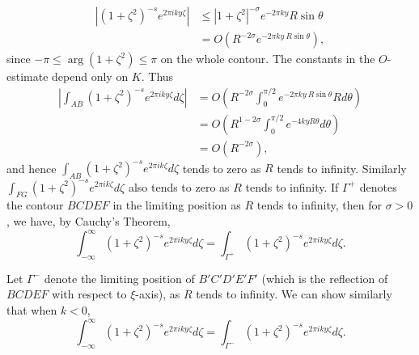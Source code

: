 \begin{align*}
|(1+\zeta^{2})^{-s}e^{2\pi iky\zeta}| &\leq
|1+\zeta^{2}|^{-\sigma}e^{-2\pi ky}R\sin \theta\\
&= O(R^{-2\sigma}e^{-2\pi ky \ R\sin \theta}),
\end{align*}
since $-\pi \leq \arg(1+\zeta^{2})\leq \pi$ on the whole contour. The
constants in the $O$-estimate depend only on $K$. Thus
\begin{align*}
\left| \int_{AB}(1+\zeta^{2})^{-s}e^{2\pi iky\zeta}d\zeta\right| &=
O \left(R^{-2\sigma}\int^{\pi/2}_{0}e^{-2\pi ky\ R\sin
  \theta}Rd\theta\right)\\
&= O \left(R^{1-2\sigma}\int^{\pi/2}_{0}e^{-4ky
  R\theta}d\theta\right)\\
&= O (R^{-2\sigma}),
\end{align*}
and hence $\int_{AB}(1+\zeta^{2})^{-s}e^{2\pi ik\zeta}d\zeta$ tends to
zero as $R$ tends to infinity. Similarly
$\int_{FG}(1+\zeta^{2})^{-s}e^{2\pi ik\zeta}d\zeta$ also tends to zero
as $R$ tends to infinity. If $\Gamma^{+}$ denotes the contour $BCDEF$
in the limiting position as $R$ tends to infinity, then for
$\sigma>0$, we have, by Cauchy's Theorem,
\begin{equation*}
\int^{\infty}_{-\infty}(1+\zeta^{2})^{-s}e^{2\pi
  iky\zeta}d\zeta=\int_{\Gamma^{+}}(1+\zeta^{2})^{-s}e^{2\pi
  iky\zeta}d\zeta.\tag{9} \label{9}
\end{equation*}

Let $\Gamma^{-}$ denote the limiting position of $B'C'D'E'F'$ (which
is the reflection of $BCDEF$ with respect to $\xi$-axis), as $R$ tends
to infinity. We can show similarly that when $k<0$,
\begin{equation*}
\int^{\infty}_{-\infty}(1+\zeta^{2})^{-s}e^{2\pi
  iky\zeta}d\zeta=\int_{\Gamma^{-}}(1+\zeta^{2})^{-s}e^{2\pi
  iky\zeta}d\zeta.\tag{10}\label{10} 
\end{equation*}

